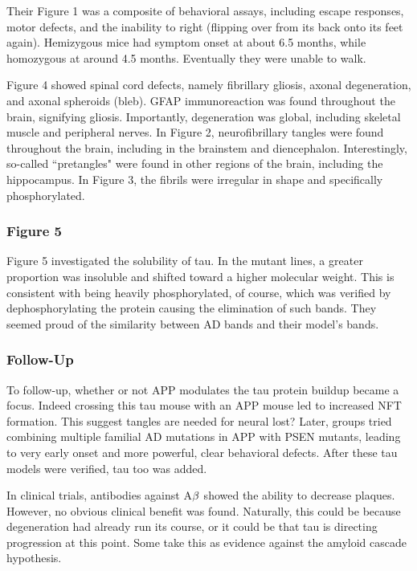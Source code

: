  Their Figure 1 was a composite of behavioral assays, including escape responses, motor defects, and the inability to right (flipping over from its back onto its feet again). Hemizygous mice had symptom onset at about 6.5 months, while homozygous at around 4.5 months. Eventually they were unable to walk.\newline

Figure 4 showed spinal cord defects, namely fibrillary gliosis, axonal degeneration, and axonal spheroids (bleb). GFAP immunoreaction was found throughout the brain, signifying gliosis. Importantly, degeneration was global, including skeletal muscle and peripheral nerves. In Figure 2, neurofibrillary tangles were found throughout the brain, including in the brainstem and diencephalon. Interestingly, so-called ``pretangles" were found in other regions of the brain, including the hippocampus. In Figure 3, the fibrils were irregular in shape and specifically phosphorylated.

 \subsubsection*{Figure 5}

Figure 5 investigated the solubility of tau. In the mutant lines, a greater proportion was insoluble and shifted toward a higher molecular weight. This is consistent with being heavily phosphorylated, of course, which was verified by dephosphorylating the protein causing the elimination of such bands. They seemed proud of the similarity between AD bands and their model's bands. 

\subsubsection*{Follow-Up}

To follow-up, whether or not APP modulates the tau protein buildup became a focus. Indeed crossing this tau mouse with an APP mouse led to increased NFT formation. This suggest tangles are needed for neural lost?  Later, groups tried combining multiple familial AD mutations in APP with PSEN mutants, leading to very early onset and more powerful, clear behavioral defects. After these tau models were verified, tau too was added.\newline

In clinical trials, antibodies against A$\beta$ showed the ability to decrease plaques. However, no obvious clinical benefit was found. Naturally, this could be because degeneration had already run its course, or it could be that tau is directing progression at this point. Some take this as evidence against the amyloid cascade hypothesis. 

